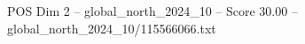 \begin{textsample}{POS Dim 2 – global\_north\_2024\_10 – Score 30.00 – global\_north\_2024\_10/115566066.txt}
\end{textsample}
